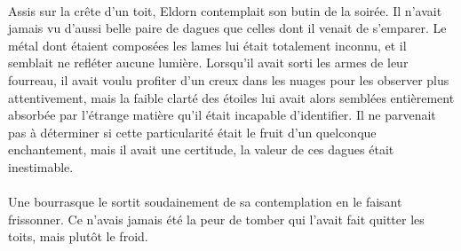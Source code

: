 \paragraph{}
Assis sur la crête d'un toit, Eldorn contemplait son butin de la soirée. Il
n'avait jamais vu d'aussi belle paire de dagues que celles dont il venait de
s'emparer. Le métal dont étaient composées les lames lui était totalement
inconnu, et il semblait ne refléter aucune lumière. Lorsqu'il avait sorti les
armes de leur fourreau, il avait voulu profiter d'un creux dans les nuages
pour les observer plus attentivement, mais la faible clarté des étoiles lui
avait alors semblées entièrement absorbée par l'étrange matière qu'il était
incapable d'identifier. Il ne parvenait pas à déterminer si cette
particularité était le fruit d'un quelconque enchantement, mais il avait une
certitude, la valeur de ces dagues était inestimable.

\paragraph{}
Une bourrasque le sortit soudainement de sa contemplation en le faisant
frissonner. Ce n'avais jamais été la peur de tomber qui l'avait fait quitter
les toits, mais plutôt le froid.